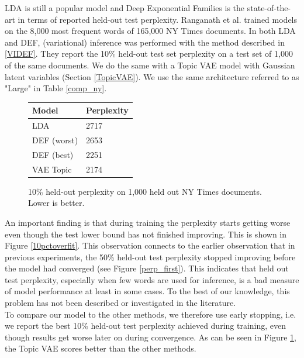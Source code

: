 \documentclass{report}
\begin{document}
	LDA is still a popular model and Deep Exponential Families is the state-of-the-art in terms of reported held-out test perplexity. Ranganath et al. \cite{ranganath2015deep} trained models on the 8,000 most frequent words of 165,000 NY Times documents. In both LDA and DEF, (variational) inference was performed with the method described in \ref{VIDEF}. They report the 10\% held-out test set perplexity on a test set of 1,000 of the same documents.  We do the same with a Topic VAE model with Gaussian latent variables (Section \ref{TopicVAE}). We use the same architecture referred to as "Large" in Table \ref{comp_ny}. \\
	\begin{figure}
		\bgroup
		\def\arraystretch{1.2}
		\begin{tabular}{||l|l||}
			\hline \hline
			Model	& Perplexity\\ \hline \hline
			LDA	&  2717\\ \hline
			DEF (worst) & 2653 \\ \hline
			DEF (best) & 2251 \\ \hline
			VAE Topic & 2174 \\ \hline \hline
		\end{tabular}
		
		\caption{10\% held-out perplexity on 1,000 held out NY Times documents. Lower is better.  \cite{ranganath2014black}}
		\egroup
		\label{comp_def}
	\end{figure}
	An important finding is that during training the perplexity starts getting worse even though the test lower bound has not finished improving.	This is shown in Figure \ref{10pctoverfit}. This observation connects to the earlier observation that in previous experiments, the 50\% held-out test perplexity stopped improving before the model had converged (see Figure \ref{perp_first}). This indicates that held out test perplexity, especially when few words are used for inference, is a bad measure of model performance at least in some cases. To the best of our knowledge, this problem has not been described or investigated in the literature. \\
	To compare our model to the other methods, we therefore use early stopping, i.e. we report the best 10\% held-out test perplexity achieved during training, even though results get worse later on during convergence. As can be seen in Figure \ref{comp_def}, the Topic VAE scores better than the other methods. 
\end{document}
